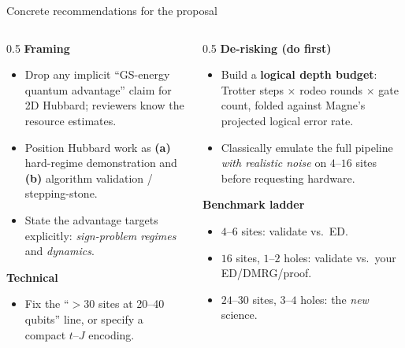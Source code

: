 \documentclass[aspectratio=169,11pt]{beamer}
\begin{document}
\begin{frame}{Concrete recommendations for the proposal}
\begin{columns}[T]
\begin{column}{0.5\textwidth}
\textbf{Framing}
\begin{itemize}\small
  \item Drop any implicit ``GS-energy quantum advantage'' claim for 2D Hubbard;
        reviewers know the resource estimates.
  \item Position Hubbard work as \textbf{(a)} hard-regime demonstration and
        \textbf{(b)} algorithm validation / stepping-stone.
  \item State the advantage targets explicitly: \emph{sign-problem regimes} and \emph{dynamics}.
\end{itemize}
\textbf{Technical}
\begin{itemize}\small
  \item Fix the ``$>30$ sites at 20--40 qubits'' line, or specify a compact $t$--$J$ encoding.
\end{itemize}
\end{column}
\begin{column}{0.5\textwidth}
\textbf{De-risking (do first)}
\begin{itemize}\small
  \item Build a \textbf{logical depth budget}:
        Trotter steps $\times$ rodeo rounds $\times$ gate count, folded against
        Magne's projected logical error rate.
  \item Classically emulate the full pipeline \emph{with realistic noise}
        on $4$--$16$ sites before requesting hardware.
\end{itemize}
\textbf{Benchmark ladder}
\begin{itemize}\small
  \item $4$--$6$ sites: validate vs.\ ED.
  \item $16$ sites, $1$--$2$ holes: validate vs.\ your ED/DMRG/proof.
  \item $24$--$30$ sites, $3$--$4$ holes: the \emph{new} science.
\end{itemize}
\end{column}
\end{columns}
\end{frame}
\end{document}
